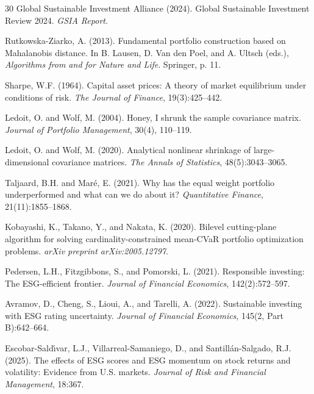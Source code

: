 \documentclass[10pt,twocolumn,a4paper]{article}
\begin{document}
\begin{thebibliography}{30}
Global Sustainable Investment Alliance (2024).
Global Sustainable Investment Review 2024.
\emph{GSIA Report}.

Rutkowska-Ziarko, A. (2013).
Fundamental portfolio construction based on Mahalanobis distance.
In B. Lausen, D. Van den Poel, and A. Ultsch (eds.), \emph{Algorithms from and for Nature and Life}. Springer, p. 11.

Sharpe, W.F. (1964).
Capital asset prices: A theory of market equilibrium under conditions of risk.
\emph{The Journal of Finance}, 19(3):425--442.

Ledoit, O. and Wolf, M. (2004).
Honey, I shrunk the sample covariance matrix.
\emph{Journal of Portfolio Management}, 30(4), 110--119.

Ledoit, O. and Wolf, M. (2020).
Analytical nonlinear shrinkage of large-dimensional covariance matrices.
\emph{The Annals of Statistics}, 48(5):3043--3065.

Taljaard, B.H. and Mar\'e, E. (2021).
Why has the equal weight portfolio underperformed and what can we do about it?
\emph{Quantitative Finance}, 21(11):1855--1868.

Kobayashi, K., Takano, Y., and Nakata, K. (2020).
Bilevel cutting-plane algorithm for solving cardinality-constrained mean-CVaR portfolio optimization problems.
\emph{arXiv preprint arXiv:2005.12797}.

Pedersen, L.H., Fitzgibbons, S., and Pomorski, L. (2021).
Responsible investing: The ESG-efficient frontier.
\emph{Journal of Financial Economics}, 142(2):572--597.

Avramov, D., Cheng, S., Lioui, A., and Tarelli, A. (2022).
Sustainable investing with ESG rating uncertainty.
\emph{Journal of Financial Economics}, 145(2, Part B):642--664.

Escobar-Sald\'\i var, L.J., Villarreal-Samaniego, D., and Santill\'an-Salgado, R.J. (2025).
The effects of ESG scores and ESG momentum on stock returns and volatility: Evidence from U.S. markets.
\emph{Journal of Risk and Financial Management}, 18:367.


\end{thebibliography}
\end{document}
